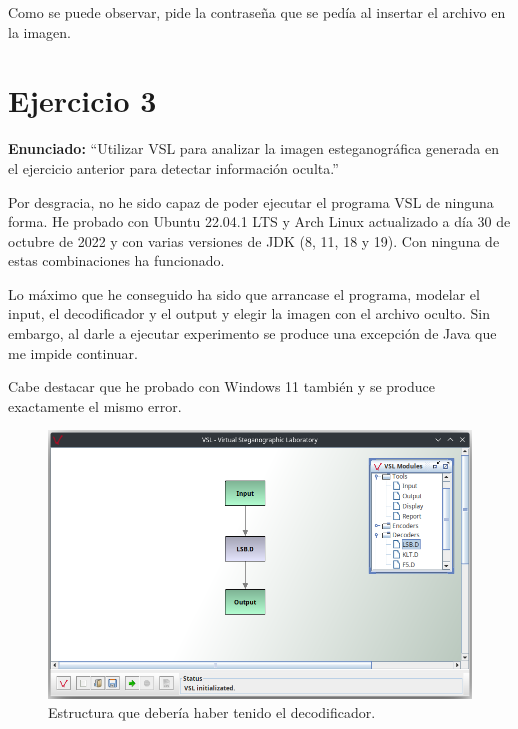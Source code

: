 \documentclass{article}
\begin{document}
\bigskip

Como se puede observar, pide la contraseña que se pedía al insertar el archivo en la imagen.

\newpage

{}
\section*{Ejercicio 3}

\textbf{Enunciado: }``Utilizar VSL para analizar la imagen esteganográfica generada en el ejercicio anterior para detectar información oculta.''

\bigskip

Por desgracia, no he sido capaz de poder ejecutar el programa VSL de ninguna forma. He probado con Ubuntu 22.04.1 LTS y Arch Linux actualizado a día 30 de octubre de 2022 y con varias versiones de JDK (8, 11, 18 y 19). Con ninguna de estas combinaciones ha funcionado. 

\bigskip

Lo máximo que he conseguido ha sido que arrancase el programa, modelar el input, el decodificador y el output y elegir la imagen con el archivo oculto. Sin embargo, al darle a ejecutar experimento se produce una excepción de Java que me impide continuar.

\bigskip

Cabe destacar que he probado con Windows 11 también y se produce exactamente el mismo error.

\begin{figure}[H]
    \includegraphics[width=\textwidth]{imagenes/Screenshot_20221030_152701.png}
    \caption{Estructura que debería haber tenido el decodificador.}
\end{figure}
\end{document}
